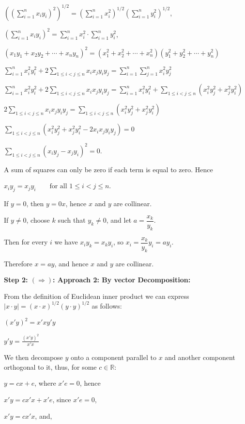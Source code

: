\documentclass[12pt]{article}
\begin{document}
  $\left(\left( \sum_{i=1}^n x_i y_i \right)^2\right)^{1/2}=\left( \sum_{i=1}^n x_i^2 \right)^{1/2}\left( \sum_{i=1}^n y_i^2 \right)^{1/2}$,

  $\left( \sum_{i=1}^n x_i y_i \right)^2= \sum_{i=1}^n x_i^2 \cdot \sum_{i=1}^n y_i^2 $,

  $(x_1y_1 + x_2y_2 + \cdots + x_ny_n)^2=(x_1^2 + x_2^2 + \cdots + x_n^2)(y_1^2 + y_2^2 + \cdots + y_n^2)$

  $\sum_{i=1}^n x_i^2 y_i^2 + 2\sum_{1 \le i < j \le n} x_i x_j y_i y_j = \sum_{i=1}^n \sum_{j=1}^n x_i^2 y_j^2$

  $\sum_{i=1}^n x_i^2 y_i^2 + 2\sum_{1 \le i < j \le n} x_i x_j y_i y_j = \sum_{i=1}^n x_i^2 y_i^2 + \sum_{1 \le i < j \le n} (x_i^2 y_j^2 + x_j^2 y_i^2)$

  $2\sum_{1 \le i < j \le n} x_i x_j y_i y_j = \sum_{1 \le i < j \le n} (x_i^2 y_j^2 + x_j^2 y_i^2)$

  $\sum_{1 \le i < j \le n} (x_i^2 y_j^2 + x_j^2 y_i^2 - 2x_i x_j y_i y_j)=0$

  $\sum_{1 \le i < j \le n} (x_i y_j - x_j y_i)^2 = 0$.

  A sum of squares can only be zero if each term is equal to zero. Hence

  $x_i y_j = x_j y_i \qquad \text{for all } 1 \le i < j \le n.$

  If $y=0$, then $y = 0x$, hence $x$ and $y$ are collinear.

  If $y \ne 0$, choose $k$ such that $y_k \ne 0$, and let $a = \dfrac{x_k}{y_k}$.

  Then for every $i$ we have $x_i y_k = x_k y_i$, so $x_i = \dfrac{x_k}{y_k} y_i = ay_i$.

  Therefore $x = ay$, and hence $x$ and $y$ are collinear.

  \newpage
  \textbf{Step 2: $(\Rightarrow)$: Approach 2: By vector Decomposition:}

  From the definition of Euclidean inner product we can express $|x \cdot y| = (x \cdot x)^{1/2}(y \cdot y)^{1/2}$ as follows:

  $(x'y)^2=x'xy'y$

  $y'y = \frac{(x'y)^2}{x'x}$

  We then decompose $y$ onto a component parallel to $x$ and another component orthogonal to it, thus, for some $c \in \mathbb{R}$:

  $y = cx + e$, where $x'e = 0$, hence

  $x'y = cx'x + x'e$, since $x'e = 0$,

  $x'y = cx'x$, and,
\end{document}
